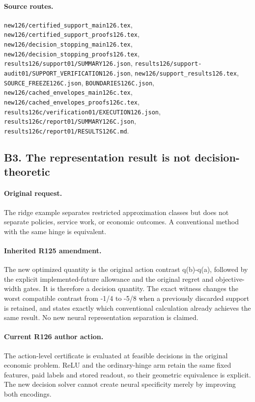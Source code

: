 \paragraph{Source routes.} \nolinkurl{new126/certified_support_main126.tex}, \nolinkurl{new126/certified_support_proofs126.tex}, \nolinkurl{new126/decision_stopping_main126.tex}, \nolinkurl{new126/decision_stopping_proofs126.tex}, \nolinkurl{results126/support01/SUMMARY126.json}, \nolinkurl{results126/support-audit01/SUPPORT_VERIFICATION126.json}, \nolinkurl{new126/support_results126.tex}, \nolinkurl{SOURCE_FREEZE126C.json}, \nolinkurl{BOUNDARIES126C.json}, \nolinkurl{new126/cached_envelopes_main126c.tex}, \nolinkurl{new126/cached_envelopes_proofs126c.tex}, \nolinkurl{results126c/verification01/EXECUTION126.json}, \nolinkurl{results126c/report01/SUMMARY126C.json}, \nolinkurl{results126c/report01/RESULTS126C.md}.

\subsection*{B3. The representation result is not decision-theoretic}
\paragraph{Original request.} The ridge example separates restricted approximation classes but does not separate policies, service work, or economic outcomes. A conventional method with the same hinge is equivalent.

\paragraph{Inherited R125 amendment.} The new optimized quantity is the original action contrast q(b)-q(a), followed by the explicit implemented-future allowance and the original regret and objective-width gates. It is therefore a decision quantity. The exact witness changes the worst compatible contrast from -1/4 to -5/8 when a previously discarded support is retained, and states exactly which conventional calculation already achieves the same result. No new neural representation separation is claimed.

\paragraph{Current R126 author action.} The action-level certificate is evaluated at feasible decisions in the original economic problem. ReLU and the ordinary-hinge arm retain the same fixed features, paid labels and stored readout, so their geometric equivalence is explicit. The new decision solver cannot create neural specificity merely by improving both encodings.

